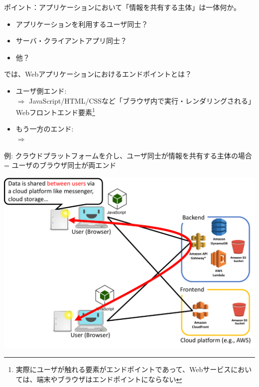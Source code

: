 \documentclass[12pt,dvipdfmx]{beamer}
\begin{document}
\begin{frame}
ポイント：アプリケーションにおいて「情報を共有する主体」は一体何か。
\begin{itemize}
 \item アプリケーションを利用するユーザ同士？
 \item サーバ・クライアントアプリ同士？
 \item 他？
\end{itemize}
\end{frame}

\begin{frame}
では、Webアプリケーションにおけるエンドポイントとは？
\begin{itemize}
\item ユーザ側エンド:\\
 $\Rightarrow$ \alert{JavaScript/HTML/CSSなど「ブラウザ内で実行・レンダリングされる」Webフロントエンド要素}\footnote[frame]{\scriptsize 実際にユーザが触れる要素がエンドポイントであって、\alert{Webサービスにおいては、端末やブラウザはエンドポイントにならない}}\\
\item もう一方のエンド:\\
 $\Rightarrow$ 
\end{itemize}

\end{frame}


\begin{frame}
例: クラウドプラットフォームを介し、\alert{ユーザ同士が情報を共有する主体}の場合 = ユーザのブラウザ同士が両エンド
\begin{center}
\includegraphics[width=0.8\linewidth]{Figs/e2e1.pdf}
\end{center}
\end{frame}
\end{document}
